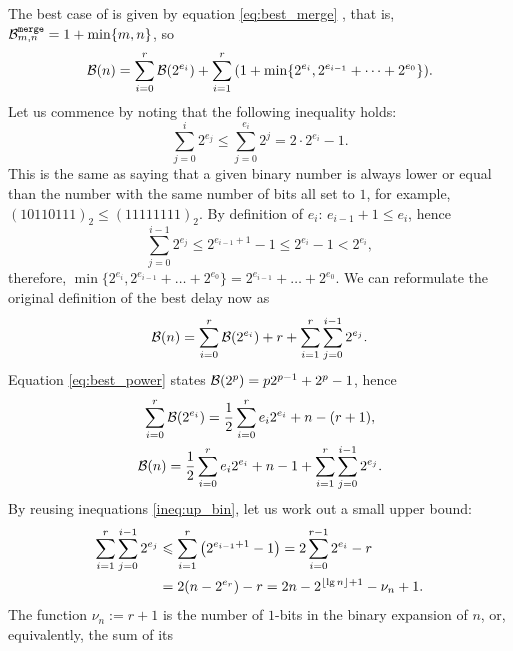 The best case of  is given by equation
\eqref{eq:best_merge} , that is,
\(\best{merge}{m,n} = 1 + \min\{m,n\}\), so
\begin{equation*}
\Bideal(n)
  =   \sum_{i=0}^{r}{\Bideal(2^{e_i})}
    + \sum_{i=1}^{r}{\left(1+\min\{2^{e_i},2^{e_{i-1}} + \dots +
                                 2^{e_0}\}\right)}.
\end{equation*}
Let us commence by noting that the following inequality holds:
\begin{equation*}
\sum_{j=0}^{i}{2^{e_j}}
\leqslant
\sum_{j=0}^{e_i}{2^j} = 2 \cdot 2^{e_i} - 1.
\end{equation*}
This is the same as saying that a given binary number is always lower
or equal than the number with the same number of bits all set to
\(1\), for example, \((10110111)_2 \leqslant (11111111)_2\). By definition of
\(e_i\): \(e_{i-1} + 1 \leqslant e_i\), hence
\begin{equation}
\sum_{j=0}^{i-1}{2^{e_j}} \leqslant 2^{e_{i-1}+1} - 1
                       \leqslant 2^{e_i} - 1 < 2^{e_i},
\label{ineq:up_bin}
\end{equation}
therefore, \(\min\{2^{e_i},2^{e_{i-1}} + \dots + 2^{e_0}\} =
2^{e_{i-1}} + \dots + 2^{e_0}\). We can reformulate the original
definition of the best delay now as
\begin{equation}
\Bideal(n)
   =   \sum_{i=0}^{r}{\Bideal(2^{e_i})}
     + r + \sum_{i=1}^{r}\sum_{j=0}^{i-1}{2^{e_j}}.
\label{eq:Bideal}
\end{equation}
Equation \eqref{eq:best_power}  states
\(\Bideal(2^p) = p2^{p-1} + 2^p - 1\), hence
\begin{gather}
\sum_{i=0}^{r}{\Bideal(2^{e_i})} =
\frac{1}{2}\sum_{i=0}^{r}{e_i2^{e_i}} + n - (r + 1),\notag\\
\Bideal(n) =
   \frac{1}{2}\sum_{i=0}^{r}{e_i2^{e_i}} + n - 1
 + \sum_{i=1}^{r}\sum_{j=0}^{i-1}{2^{e_j}}.\label{eq:B_n_tmp}
\end{gather}
By reusing inequations \eqref{ineq:up_bin}, let us work out a small
upper bound:
\begin{align}
\sum_{i=1}^{r}\sum_{j=0}^{i-1}{2^{e_j}}
&\leqslant \sum_{i=1}^{r}\left(2^{e_{i-1}+1}-1\right)
= 2 \sum_{i=0}^{r-1}{2^{e_i}} - r\notag\\
&= 2 (n - 2^{e_r}) - r
= 2n - 2^{\floor{\lg n} + 1} - \nu_{n} + 1.
\label{ineq:double_upper}
\end{align}
The function \(\nu_{n} := r+1\) is the number of \(1\)\hyp{}bits in
the binary expansion of \(n\), or, equivalently, the sum of its

